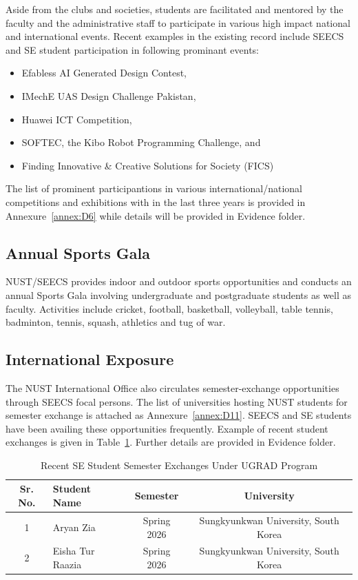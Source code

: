Aside from the clubs and societies, students are facilitated and mentored by the faculty and the administrative staff to participate in various high impact national and international events. Recent examples in the existing record include SEECS and SE student participation in following prominant events:
\begin{itemize}
    \item Efabless AI Generated Design Contest,
    \item IMechE UAS Design Challenge Pakistan,
    \item Huawei ICT Competition,
    \item SOFTEC, the Kibo Robot Programming Challenge, and
    \item Finding Innovative \& Creative Solutions for Society (FICS)
\end{itemize}
The list of prominent participantions in various international/national competitions and exhibitions with in the last three years is provided in Annexure~\ref{annex:D6} while details will be provided in Evidence folder.

\subsection{Annual Sports Gala}
\label{subsec:sports-gala}

NUST/SEECS provides indoor and outdoor sports opportunities and conducts an annual Sports Gala involving undergraduate and postgraduate students as well as faculty. Activities include cricket, football, basketball, volleyball, table tennis, badminton, tennis, squash, athletics and tug of war.

\subsection{International Exposure}
\label{subsec:financial-support}

The NUST International Office also circulates semester-exchange opportunities through SEECS focal persons. The list of universities hosting NUST students for semester exchange is attached as Annexure~\ref{annex:D11}. SEECS and SE students have been availing these opportunities frequently. Example of recent student exchanges is given in Table~\ref{tab:exchange}. Further details are provided in Evidence folder.

\begin{table}[H]
\centering
\caption{Recent SE Student Semester Exchanges Under UGRAD Program}
\label{tab:exchange}
\begin{tabular}{@{}clcc@{}}
\toprule
\textbf{Sr. No.} &
\textbf{Student Name} &
\textbf{Semester} &
\textbf{University} \\
\midrule
1 & Aryan Zia & Spring 2026 & Sungkyunkwan University, South Korea \\
2 & Eisha Tur Raazia & Spring 2026 & Sungkyunkwan University, South Korea \\
\bottomrule
\end{tabular}
\end{table}

